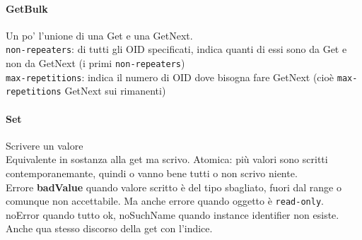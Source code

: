 \documentclass[10pt]{book}
\begin{document}
\paragraph{GetBulk} Un po' l'unione di una Get e una GetNext.\\
\texttt{non-repeaters}: di tutti gli OID specificati, indica quanti di essi sono da Get e non da GetNext (i primi \texttt{non-repeaters})\\
\texttt{max-repetitions}: indica il numero di OID dove bisogna fare GetNext (cioè \texttt{max-repetitions} GetNext sui rimanenti)

\paragraph{Set} Scrivere un valore\\
Equivalente in sostanza alla get ma scrivo. Atomica: più valori sono scritti contemporanemante, quindi o vanno bene tutti o non scrivo niente.\\
Errore \textbf{badValue} quando valore scritto è del tipo sbagliato, fuori dal range o comunque non accettabile. Ma anche errore quando oggetto è \texttt{read-only}.\\
noError quando tutto ok, noSuchName quando instance identifier non esiste. Anche qua stesso discorso della get con l'indice.
\end{document}
